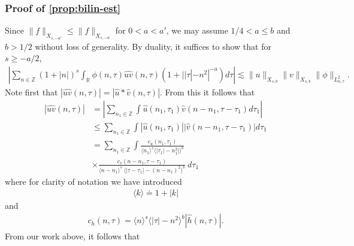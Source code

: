 \documentclass[12pt,reqno]{amsart}
\numberwithin{equation}{section}  %
\numberwithin{figure}{section}
\newcommand{\rr}{\mathbb{R}}
\newcommand{\zz}{\mathbb{Z}}
\newcommand{\zzdot}{\dot{\zz}}
\newcommand{\wh}{\widehat}
\theoremstyle{plain}
\theoremstyle{definition}
\theoremstyle{remark}
\begin{document}
\subsubsection{Proof of \autoref{prop:bilin-est}} 
\label{sssec:proof-bilin-est}
Since $\|f\|_{X_{s,-a'}} \le \|f\|_{X_{s, -a}}$ for $0 < a < a'$, we may assume
$1/4 < a \le b$ and $b > 1/2$ without loss of generality.
By duality, it suffices to show that for $s \ge -a/2$, 
%
\begin{equation}
	\label{duality-est}
	\begin{split}
	|	\sum_{n \in \zzdot}  (1 + |n|)^{s}
		\int_{\rr} \phi(n, \tau) \wh{uv}(n, \tau)(1 
    + | |\tau| - n^{2} |^{-a}) d \tau | \lesssim \|u\|_{X_{s,b}}
    \|v\|_{X_{s,b}}
    \|\phi \|_{L^{2}_{n, \tau}}.
	\end{split}
\end{equation}
Note first that $|\wh{uv}(n, \tau) |  = | \wh{u} *  \wh{v} 
(n, \tau)|$. From this it follows that
%
%
\begin{equation}
	\label{non-lin-rep}
	\begin{split}
		| \wh{uv}(n, \tau)|
    & = | \sum_{n_{1} \in \zz }  \int
    \wh{u}\left( n_1,  \tau_1 \right) \wh{v}\left( n - n_1 , \tau - \tau_1   
\right) d \tau_1 |
\\
& \le  \sum_{n_{1} \in \zz }  \int
    |\wh{u}\left( n_1,  \tau_1 \right)| |\wh{v}\left( n - n_1 , \tau - \tau_1   
\right)| d \tau_1 
\\
& = \sum_{n_1 \in \zz } \int \frac{c_u\left( n_1, \tau_1 
\right)}{\langle n_1 \rangle ^s \langle |\tau_1| - n_1^{2} | \rangle ^{b}}
\\
& \times \frac{c_{v}\left( n - n_1, \tau - \tau_1 \right)}{\langle n -
n_1 \rangle ^s\ \langle |\tau - \tau_1 | -  (n - n_1)^{2} \rangle^{b}}
  \ d \tau_1 
\end{split}
\end{equation}
%
%
where for clarity of notation we have introduced 
%
%
%
\begin{equation*}
\begin{split}
\langle k \rangle \doteq 1 + |k|
\end{split}
\end{equation*}
%
%
and
%
\begin{equation*}
	\begin{split}
		c_h(n, \tau) =
			\langle n \rangle ^s \langle |\tau| - n^{2} \rangle ^{b} | \wh{h}\left( n, \tau \right) |.
	\end{split}
\end{equation*}
%
%
From our work above, it follows that 
\end{document}
